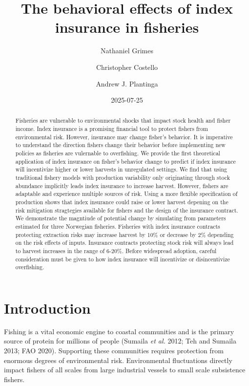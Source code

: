 \documentclass[
  letterpaper,
  DIV=11,
  numbers=noendperiod]{scrartcl}
\title{The behavioral effects of index insurance in fisheries}
\author{Nathaniel Grimes \and Christopher Costello \and Andrew J.
Plantinga}
\date{2025-07-25}
\renewcommand*\contentsname{Table of contents}
\newcommand\contentsname{Table of contents}
\theoremstyle{plain}
\theoremstyle{plain}
\theoremstyle{remark}
\begin{document}
\maketitle
\begin{abstract}
Fisheries are vulnerable to environmental shocks that impact stock
health and fisher income. Index insurance is a promising financial tool
to protect fishers from environmental risk. However, insurance may
change fisher's behavior. It is imperative to understand the direction
fishers change their behavior before implementing new policies as
fisheries are vulernable to overfishing. We provide the first
theoretical application of index insurance on fisher's behavior change
to predict if index insurance will incentivize higher or lower harvests
in unregulated settings. We find that using traditional fishery models
with production variability only originating through stock abundance
implicitly leads index insurance to increase harvest. However, fishers
are adaptable and experience multiple sources of risk. Using a more
flexible specification of production shows that index insurance could
raise or lower harvest depening on the risk mitigation stragtegies
available for fishers and the design of the insurance contract. We
demonstrate the magntiude of potential change by simulating from
parameters estimated for three Norwegian fisheries. Fisheries with index
insurance contracts protecting extraction risks may increase harvest by
10\% or decrease by 2\% depending on the risk effects of inputs.
Insurance contracts protecting stock risk will always lead to harvest
increases in the range of 6-20\%. Before widespread adoption, careful
consideration must be given to how index insurance will incentivize or
disincentivize overfishing.
\end{abstract}

\renewcommand*\contentsname{Table of contents}
{
\hypersetup{linkcolor=}
\setcounter{tocdepth}{3}
\tableofcontents
}

\section{Introduction}\label{introduction}

Fishing is a vital economic engine to coastal communities and is the
primary source of protein for millions of people (Sumaila \emph{et al.}
2012; Teh and Sumaila 2013; FAO 2020). Supporting these communities
requires protection from enormous degrees of environmental risk.
Environmental fluctuations directly impact fishers of all scales from
large industrial vessels to small scale subsistence fishers.
\end{document}
